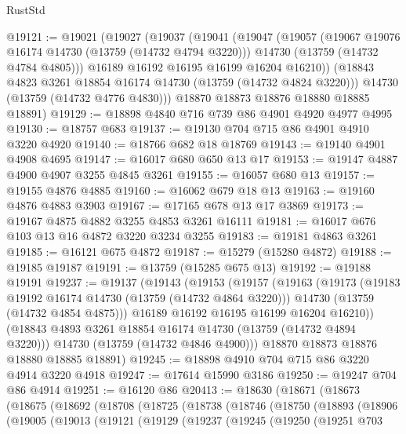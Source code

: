 \begin{lexlean}{RustStd}
\begin{coremodule}
@19121 := @19021
    (@19027
      (@19037
        (@19041
          (@19047
            (@19057
              (@19067 @19076 @16174 @14730 (@13759 (@14732 @4794 @3220)))
              @14730
              (@13759 (@14732 @4784 @4805)))
            @16189
            @16192
            @16195
            @16199
            @16204
            @16210))
        (@18843 @4823 @3261 @18854 @16174 @14730 (@13759 (@14732 @4824 @3220)))
        @14730
        (@13759 (@14732 @4776 @4830)))
      @18870
      @18873
      @18876
      @18880
      @18885
      @18891)
@19129 := @18898 @4840 @716 @739 @86 @4901 @4920 @4977 @4995
@19130 := @18757 @683
@19137 := @19130 @704 @715 @86 @4901 @4910 @3220 @4920
@19140 := @18766 @682 @18 @18769
@19143 := @19140 @4901 @4908 @4695
@19147 := @16017 @680 @650 @13 @17
@19153 := @19147 @4887 @4900 @4907 @3255 @4845 @3261
@19155 := @16057 @680 @13
@19157 := @19155 @4876 @4885
@19160 := @16062 @679 @18 @13
@19163 := @19160 @4876 @4883 @3903
@19167 := @17165 @678 @13 @17 @3869
@19173 := @19167 @4875 @4882 @3255 @4853 @3261 @16111
@19181 := @16017 @676 @103 @13 @16 @4872 @3220 @3234 @3255
@19183 := @19181 @4863 @3261
@19185 := @16121 @675 @4872
@19187 := @15279 (@15280 @4872)
@19188 := @19185 @19187
@19191 := @13759 (@15285 @675 @13)
@19192 := @19188 @19191
@19237 := @19137
    (@19143
      (@19153
        (@19157
          (@19163
            (@19173
              (@19183 @19192 @16174 @14730 (@13759 (@14732 @4864 @3220)))
              @14730
              (@13759 (@14732 @4854 @4875)))
            @16189
            @16192
            @16195
            @16199
            @16204
            @16210))
        (@18843 @4893 @3261 @18854 @16174 @14730 (@13759 (@14732 @4894 @3220)))
        @14730
        (@13759 (@14732 @4846 @4900)))
      @18870
      @18873
      @18876
      @18880
      @18885
      @18891)
@19245 := @18898 @4910 @704 @715 @86 @3220 @4914 @3220 @4918
@19247 := @17614 @15990 @3186
@19250 := @19247 @704 @86 @4914
@19251 := @16120 @86
@20413 := @18630
    (@18671
      (@18673
        (@18675
          (@18692
            (@18708
              (@18725
                (@18738
                  (@18746
                    (@18750
                      (@18893
                        (@18906
                          (@19005
                            (@19013
                              (@19121
                                (@19129
                                  (@19237
                                    (@19245
                                      (@19250
                                        (@19251
                                          @703

\end{coremodule}
\end{lexlean}

